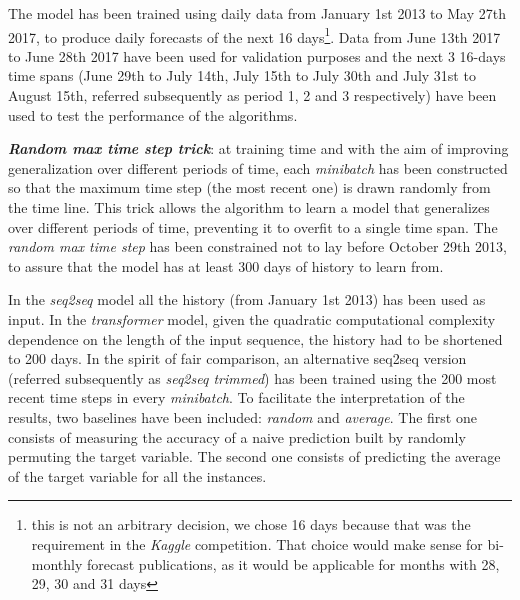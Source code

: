 \documentclass{elsarticle}
\begin{document}
	The model has been trained using daily data from January 1st 2013 to May 27th 2017, to produce daily forecasts of the next 16 days\footnote{this is not an arbitrary decision, we chose 16 days because that was the requirement in the \textit{Kaggle} competition. That choice would make sense for bi-monthly forecast publications, as it would be applicable for months with 28, 29, 30 and 31 days}. Data from  June 13th 2017 to June 28th 2017 have been used for validation purposes and the next 3 16-days time spans (June 29th to July 14th, July 15th to July 30th and July 31st to August 15th, referred subsequently as period 1, 2 and 3 respectively) have been used to test the performance of the algorithms.
	
	\textit{\textbf{Random max time step trick}}: at training time and with the aim of improving generalization over different periods of time, each \textit{minibatch} has been constructed so that the maximum time step (the most recent one)  is drawn randomly from the time line. This trick allows the algorithm to learn a model that generalizes over different periods of time, preventing it to overfit to a single time span. The \textit{random max time step} has been constrained not to lay before October 29th 2013, to assure that the model has at least 300 days of history to learn from. 
	
	In the \textit{seq2seq} model all the history (from January 1st 2013) has been used as input.  In the \textit{transformer} model, given the quadratic computational complexity dependence on the length of the input sequence, the history had to be shortened to 200 days. In the spirit of fair comparison, an alternative seq2seq version (referred subsequently as \textit{seq2seq trimmed}) has been trained using the 200 most recent time steps in every \textit{minibatch}. To facilitate the interpretation of the results, two baselines have been included: \textit{random} and \textit{average}. The first one consists of measuring the accuracy of a naive prediction built by randomly permuting the target variable. The second one consists of predicting the average of the target variable for all the instances. 
	
\end{document}
